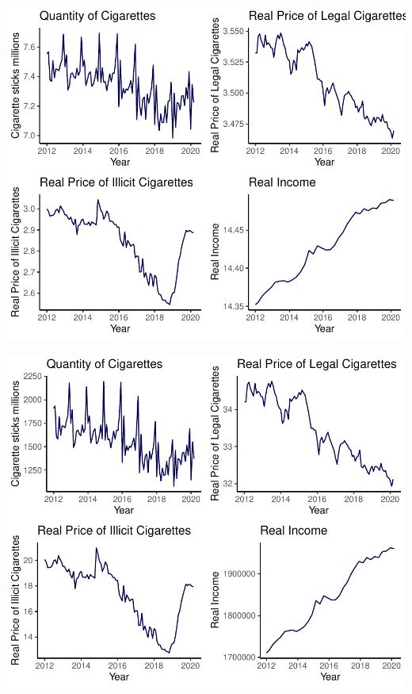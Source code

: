 \documentclass[11pt,preprint, authoryear]{elsarticle}
\let\origfigure\figure
\let\endorigfigure\endfigure
\renewenvironment{figure}[1][2] {
    \expandafter\origfigure\expandafter[H]
} {
    \endorigfigure
}
\numberwithin{equation}{section}
\numberwithin{figure}{section}
\numberwithin{table}{section}
\begin{document}
\begin{figure}[H]

{\centering \includegraphics{Thesis_files/figure-latex/Figure1-1} 

}

\caption{Time Series Plot \label{Figure1}}\label{fig:Figure1-1}
\end{figure}
\begin{figure}[H]

{\centering \includegraphics{Thesis_files/figure-latex/Figure1-2} 

}

\caption{Time Series Plot \label{Figure1}}\label{fig:Figure1-2}
\end{figure}
\end{document}

